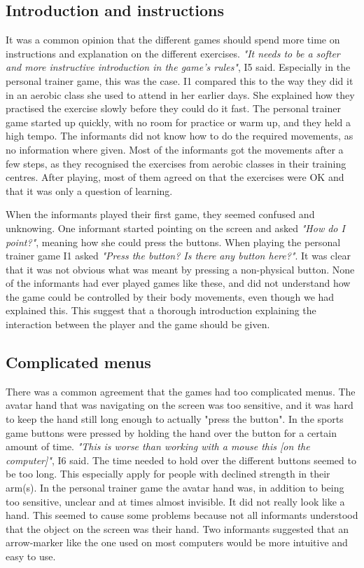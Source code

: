 \subsection{Introduction and instructions}
It was a common opinion that the different games should spend more time on instructions and explanation on the different exercises. \emph{"It needs to be a softer and more instructive introduction in the game's rules"}, I5 said. Especially in  the personal trainer game, this was the case. I1 compared this to the way they did it in an aerobic class she used to attend in her earlier days. She explained how they practised the exercise slowly before they could do it fast. The personal trainer game started up quickly, with no room for practice or warm up, and they held a high tempo. The informants did not know how to do the required movements, as no information where given. Most of the informants got the movements after a few steps, as they recognised the exercises from aerobic classes in their training centres. After playing, most of them agreed on that the exercises were OK and that it was only a question of learning. 

When the informants played their first game, they seemed confused and unknowing. One informant started pointing on the screen and asked \emph{"How do I point?"}, meaning how she could press the buttons. When playing the personal trainer game I1 asked \emph{"Press the button? Is there any button here?"}. It was clear that it was not obvious what was meant by pressing a non-physical button. None of the informants had ever played games like these, and did not understand how the game could be controlled by their body movements, even though we had explained this. This suggest that a thorough introduction explaining the interaction between the player and the game should be given. 

\subsection{Complicated menus}
There was a common agreement that the games had too complicated menus.  The avatar hand that was navigating on the screen was too sensitive, and it was hard to keep the hand still long enough to actually "press the button". In the sports game buttons were pressed by holding the hand over the button for a certain amount of time. \emph{"This is worse than working with a mouse this [on the computer]"}, I6 said. The time needed to hold over the different buttons seemed to be too long. This especially apply for people with declined strength in their arm(s). In the personal trainer game the avatar hand was, in addition to being too sensitive, unclear and at times almost invisible. It did not really look like a hand. This seemed to cause some problems because not all informants understood that the object on the screen was their hand. Two informants suggested that an arrow-marker like the one used on most computers would be more intuitive and easy to use. 

